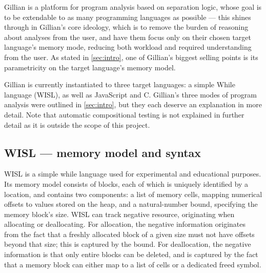 Gillian is a platform for program analysis based on separation logic, whose
goal is to be extendable to as many programming languages as possible --- this
shines through in Gillian's core ideology, which is to remove the burden of
reasoning about analyses from the user, and have them focus only on their
chosen target language's memory mode, reducing both workload and required
understanding from the user. As stated in \autoref{sec:intro}, one of
Gillian's biggest selling points is its parametricity on the target language's
memory model.

Gillian is currently instantiated to three target languages: a simple While
language (WISL), as well as JavaScript and C. Gillian's three modes of program
analysis were outlined in \autoref{sec:intro}, but they each deserve an
explanation in more detail. Note that automatic compositional testing is not
explained in further detail as it is outside the scope of this project.

\subsection{WISL --- memory model and syntax}
WISL is a simple while language used for experimental and educational purposes. Its memory model consists of blocks, each of which is uniquely identified by a location, and contains two components: a list of memory cells, mapping numerical offsets to values stored on the heap, and a natural-number bound, specifying the memory block's size.  WISL can track negative resource, originating when allocating or deallocating. For allocation, the negative information originates from the fact that a freshly allocated block of a given size must not have offsets beyond that size; this is captured by the bound. For deallocation, the negative information is that only entire blocks can be deleted, and is captured by the fact that a memory block can either map to a list of cells or a dedicated freed symbol.

